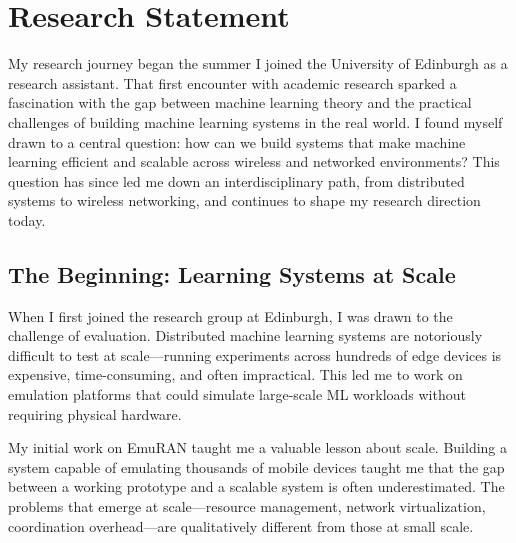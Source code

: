 \documentclass[letterpaper,11pt]{article}
\begin{document}
%

\section{Research Statement}

My research journey began the summer I joined the University of Edinburgh as a research assistant. That first encounter with academic research sparked a fascination with the gap between machine learning theory and the practical challenges of building machine learning systems in the real world. I found myself drawn to a central question: how can we build systems that make machine learning efficient and scalable across wireless and networked environments? This question has since led me down an interdisciplinary path, from distributed systems to wireless networking, and continues to shape my research direction today.

\subsection*{The Beginning: Learning Systems at Scale}

When I first joined the research group at Edinburgh, I was drawn to the challenge of evaluation. Distributed machine learning systems are notoriously difficult to test at scale---running experiments across hundreds of edge devices is expensive, time-consuming, and often impractical. This led me to work on emulation platforms that could simulate large-scale ML workloads without requiring physical hardware.

My initial work on EmuRAN taught me a valuable lesson about scale. Building a system capable of emulating thousands of mobile devices taught me that the gap between a working prototype and a scalable system is often underestimated. The problems that emerge at scale---resource management, network virtualization, coordination overhead---are qualitatively different from those at small scale.
\end{document}

